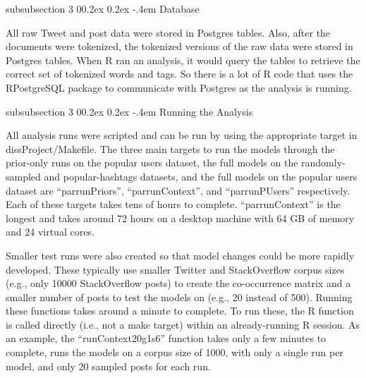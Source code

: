 \documentclass[man,floatsintext,donotrepeattitle]{apa6}
\makeatletter
\renewcommand{\subsubsection}{%
  \@startsection
  {subsubsection}%
  {3}%
  {\parindent}%
  {0\baselineskip \@plus 0.2ex \@minus 0.2ex}%
  {-.4em}%
  {\normalfont\normalsize\bfseries\addperi}}
\makeatother
\begin{document}
\subsubsection{Database}

All raw Tweet and post data were stored in Postgres tables.
Also, after the documents were tokenized, the tokenized versions of the raw data were stored in Postgres tables.
When R ran an analysis, it would query the tables to retrieve the correct set of tokenized words and tags.
So there is a lot of R code that uses the RPostgreSQL package to communicate with Postgres as the analysis is running.

\subsubsection{Running the Analysis}

All analysis runs were scripted and can be run by using the appropriate target in dissProject/Makefile.
The three main targets to run the models through the prior-only runs on the popular users dataset,
the full models on the randomly-sampled and popular-hashtags datasets,
and the full models on the popular users dataset are ``parrunPriors'', ``parrunContext'', and ``parrunPUsers'' respectively.
Each of these targets takes tens of hours to complete.
``parrunContext'' is the longest and takes around 72 hours on a desktop machine with 64 GB of memory and 24 virtual cores.

Smaller test runs were also created so that model changes could be more rapidly developed.
These typically use smaller Twitter and StackOverflow corpus sizes (e.g., only \num{10000} StackOverflow posts) to create the co-occurrence matrix
and a smaller number of posts to test the models on (e.g., 20 instead of 500).
Running these functions takes around a minute to complete.
To run these, the R function is called directly (i.e., not a make target) within an already-running R session.
As an example, the ``runContext20g1s6'' function takes only a few minutes to complete, runs the models on a corpus size of \num{1000}, with only a single run per model, and only 20 sampled posts for each run.
\end{document}
